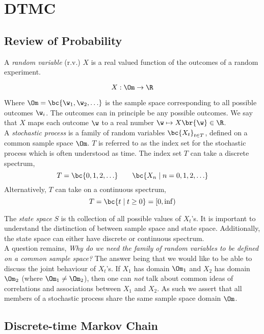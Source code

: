 \documentclass{article}
\begin{document}
\titlePage

\tableOfContents

\disclaimer

\section{DTMC}

\subsection{Review of Probability}

A \textit{random variable} (r.v.) $X$ is a real valued function of the outcomes of a random experiment.

\[ X : \Om \to \R \]

Where $\Om = \bc{\w_1, \w_2, \ldots}$ is the sample space corresponding to all possible outcomes $\w_i$. The outcomes can in principle be any possible outcomes. We say that $X$ maps each outcome $\w$ to a real number $\w \mapsto X\br{\w} \in \R$. \\

A \textit{stochastic process} is a family of random variables $\bc{X_t}_{t \in T}$, defined on a common sample space $\Om$. $T$ is referred to as the index set for the stochastic process which is often understood as time. The index set $T$ can take a discrete spectrum,
\[ T = \bc{0, 1, 2, \ldots} \qquad \bc{X_n \mid n = 0, 1, 2, \ldots} \]
Alternatively, $T$ can take on a continuous spectrum,
\[ T = \bc{t \mid t \geq 0} = \left[ 0 , \inf \right) \]

The \textit{state space} $S$ is th collection of all possible values of $X_t$'s. It is important to understand the distinction of between sample space and state space. Additionally, the state space can either have discrete or continuous spectrum. \\

A question remains, \textit{Why do we need the family of random variables to be defined on a common sample space?} The answer being that we would like to be able to discuss the joint behaviour of $X_t$'s. If $X_1$ has domain $\Om_1$ and $X_2$ has domain $\Om_2$ (where $\Om_1 \neq \Om_2$), then one can \textit{not} talk about common ideas of correlations and associations between $X_1$ and $X_2$. As such we assert that all members of a stochastic process share the same sample space domain $\Om$.

\subsection{Discrete-time Markov Chain}
\end{document}

